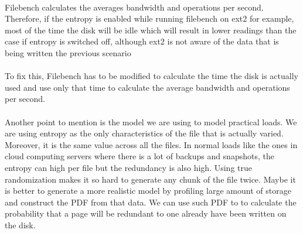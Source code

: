 \paragraph{}
 Filebench calculates the averages bandwidth and operations per second.
 Therefore, if the entropy is enabled while running filebench on ext2 for example, most of the time the disk will be idle which will result in lower readings than the case if entropy is switched off, although ext2 is not aware of the data that is being written the previous scenario 
\paragraph{}
To fix this, Filebench has to be modified to calculate the time the disk is actually used and use only that time to calculate the average bandwidth and operations per second.
\paragraph{}
Another point to mention is the model we are using to model practical loads. We are using entropy as the only characteristics of the file that is actually varied.
 Moreover, it is the same value across all the files. In normal loads like the ones in cloud computing servers where there is a lot of backups and snapshots, the entropy can high per file but the redundancy is also high.
 Using true randomization makes it so hard to generate any chunk of the file twice.
 Maybe it is better to generate a more realistic model by profiling large amount of storage and construct the PDF from that data. We can use such PDF to to calculate the probability that a page will be redundant to one already have been written on the disk.
